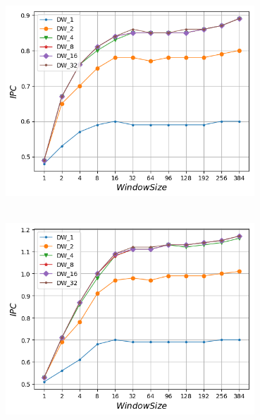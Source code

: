\vspace{3mm}
   \begin{minipage}{\textwidth}
      \begin{center}
         \\
         \vspace{3mm}
         \includegraphics[width=0.7\textwidth, frame]{./graphs/ipc/gcc.png}
         \vspace{6mm}
      \end{center}
   \end{minipage}

   \begin{minipage}{\textwidth}
      \begin{center}
         \\
         \vspace{3mm}
         \includegraphics[width=0.7\textwidth, frame]{./graphs/ipc/sjeng.png}
         \vspace{6mm}
      \end{center}
   \end{minipage}
